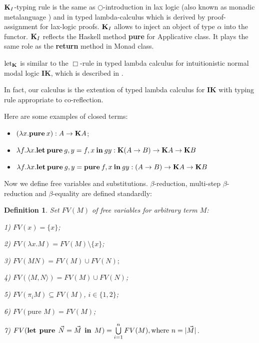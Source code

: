 \documentclass[a4paper]{article}
\newtheorem{defin}{Definition}
\begin{document}
  ${\bf K}_I$-typing rule is the same as $\bigcirc$-introduction in lax logic (also known as monadic
  metalanguage \cite{Lax}) and in typed lambda-calculus which is derived by proof-assignment for lax-logic
  proofs.
  ${\bf K}_I$ allows to inject an object of type $\alpha$ into the functor. ${\bf K}_I$  reflects the
  Haskell method {\bf pure} for Applicative class. It plays the same role as the {\bf return} method in Monad class.

  $\text{let}_{{\bf K}}$ is similar to the $\Box$-rule in typed lambda calculus for intuitionistic normal modal logic {\bf IK}, which is described in \cite{ModalK}.

  In fact, our calculus is the extention of typed lambda calculus for {\bf IK} with typing rule appropriate to co-reflection.

  \vspace{\baselineskip}

Here are some examples of closed terms:

\begin{itemize}
\item $(\lambda x. {\bf pure \: } x) : A \to \textbf{K}A$;
\item $\lambda f. \lambda x. {\bf let \: pure} \: g, y  = f, x {\: \bf in \:} g y : {\bf K}(A \to B) \to {\bf K} A \to {\bf K} B$
\item $\lambda f. \lambda x. {\bf let \:pure} \: g, y = {\bf pure \:} f, x  {\: \bf in \: } g y : (A \to B) \to {\bf K} A \to {\bf K} B$
\end{itemize}

  \vspace{\baselineskip}

  Now we define free variables and substitutions. $\beta$-reduction, multi-step $\beta$-reduction and $\beta$-equality are defined standardly:

  \begin{defin} Set $FV(M)$ of free variables for arbitrary term $M$:

  1) $FV(x) = \{ x \}$;

  2) $FV(\lambda x. M) = FV(M) \setminus \{ x\}$;

  3) $FV(M N) = FV(M) \cup FV(N);$

  4) $FV(\langle M,N \rangle) = FV(M) \cup FV(N)$;

  5) $FV(\pi_i M) \subseteq FV(M)$, $i \in \{ 1, 2\}$;

  6) $FV(\text{pure } M) = FV(M)$;

  7) $FV({\bf let \:\: pure} \:\: \vec{N} = \vec{M} \:\: {\bf in} \:\: M) = \bigcup \limits_{i = 1}^n FV(M), \text{where $n = |\vec{M}|$}$.
  \end{defin}
\end{document}
